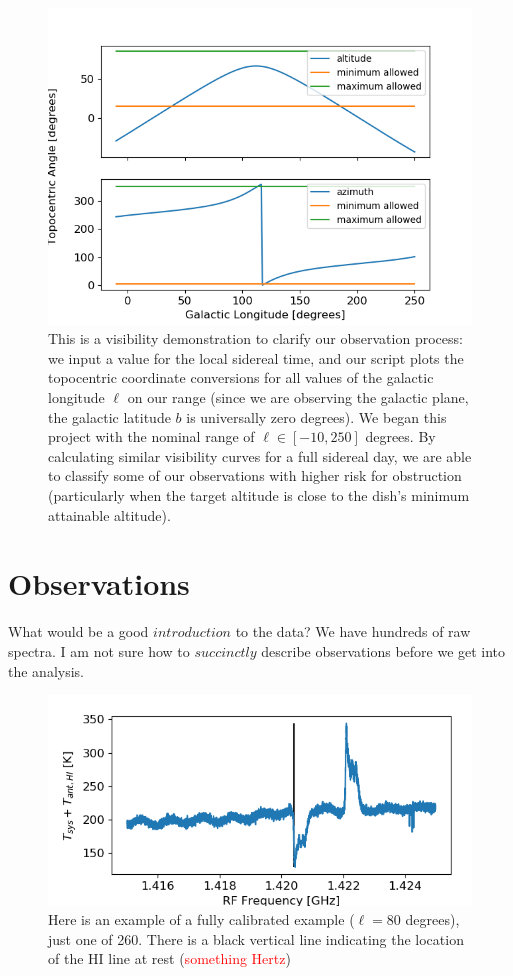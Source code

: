 \documentclass[12pt]{article}
\begin{document}
\begin{figure}
	\centering
	\includegraphics[width=.75\linewidth]{1940_10_05_2020}
	\caption{This is a visibility demonstration to clarify our observation process: we input a value for the local sidereal time, and our script plots the topocentric coordinate conversions for all values of the galactic longitude $\ell$ on our range (since we are observing the galactic plane, the galactic latitude $b$ is universally zero degrees). We began this project with the nominal range of $\ell \in [-10, 250]$ degrees. By calculating similar visibility curves for a full sidereal day, we are able to classify some of our observations with higher risk for obstruction (particularly when the target altitude is close to the dish's minimum attainable altitude).}
	\label{fig:vis_demo}
\end{figure}

\section{Observations}

\quad \quad What would be a good $introduction$ to the data? We have hundreds of raw spectra. I am not sure how to $succinctly$ describe observations before we get into the analysis.

\begin{figure}
	\centering
	\includegraphics[width=.8\linewidth]{cal_ex_80_deg}
	\caption{Here is an example of a fully calibrated example ($\ell = 80$ degrees), just one of 260. There is a black vertical line indicating the location of the HI line at rest (\textcolor{red}{something Hertz})}
	\label{fig:cal_ex}
\end{figure}
\end{document}
